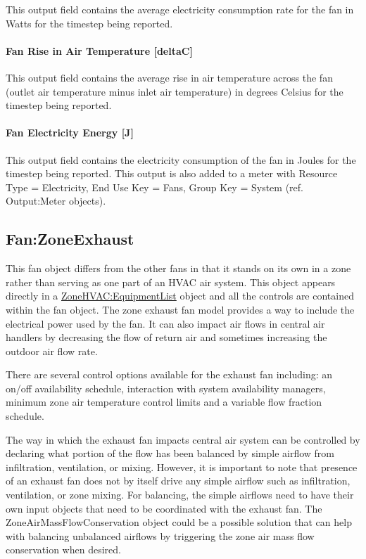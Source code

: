 This output field contains the average electricity consumption rate for the fan in Watts for the timestep being reported.

\paragraph{Fan Rise in Air Temperature {[}deltaC{]}}\label{fan-rise-in-air-temperature-deltac-2}

This output field contains the average rise in air temperature across the fan (outlet air temperature minus inlet air temperature) in degrees Celsius for the timestep being reported.

\paragraph{Fan Electricity Energy {[}J{]}}\label{fan-electric-energy-j-2}

This output field contains the electricity consumption of the fan in Joules for the timestep being reported. This output is also added to a meter with Resource Type = Electricity, End Use Key = Fans, Group Key = System (ref. Output:Meter objects).

\subsection{Fan:ZoneExhaust}\label{fanzoneexhaust}

This fan object differs from the other fans in that it stands on its own in a zone rather than serving as one part of an HVAC air system. This object appears directly in a \hyperref[zonehvacequipmentlist]{ZoneHVAC:EquipmentList} object and all the controls are contained within the fan object. The zone exhaust fan model provides a way to include the electrical power used by the fan. It can also impact air flows in central air handlers by decreasing the flow of return air and sometimes increasing the outdoor air flow rate.

There are several control options available for the exhaust fan including: an on/off availability schedule, interaction with system availability managers, minimum zone air temperature control limits and a variable flow fraction schedule.

The way in which the exhaust fan impacts central air system can be controlled by declaring what portion of the flow has been balanced by simple airflow from infiltration, ventilation, or mixing. However, it is important to note that presence of an exhaust fan does not by itself drive any simple airflow such as infiltration, ventilation, or zone mixing. For balancing, the simple airflows need to have their own input objects that need to be coordinated with the exhaust fan. The ZoneAirMassFlowConservation object could be a possible solution that can help with balancing unbalanced airflows by triggering the zone air mass flow conservation when desired. 

